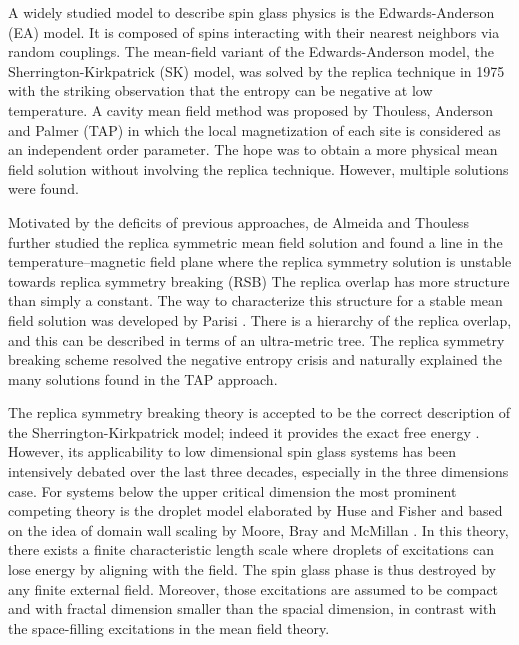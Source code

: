 A widely studied model to describe spin glass physics is the Edwards-Anderson 
(EA) model\cite{Edwards-Anderson1975}. It is composed of spins interacting
with their nearest neighbors via random couplings. The mean-field variant of the 
Edwards-Anderson model, the Sherrington-Kirkpatrick (SK) model\cite{Sherrington-Kirkpatrick1978,Sherrington-Kirkpatrick-1975},
was solved by the replica technique in 1975 with the striking observation that 
the entropy can be negative at low temperature\cite{Sherrington-Kirkpatrick-1975,Sherrington-Kirkpatrick1978}. 
A cavity mean field method was proposed by Thouless, Anderson 
and Palmer (TAP) in which the local magnetization of each site is considered as 
an independent order parameter\cite{Thouless-Anderson-Palmer-1977}. The hope was to 
obtain a more physical mean field solution without involving the replica technique. 
However, multiple solutions were found\cite{Bray-Moore-1980}.

Motivated by the deficits of previous approaches, de Almeida and Thouless
further studied the replica symmetric mean field solution and found a line 
in the temperature--magnetic field plane where the replica symmetry
solution is unstable towards replica symmetry breaking (RSB) \cite{Almedia-Thouless1978,Bray-Moore-1978}
The replica overlap has more structure than simply a constant. The way to 
characterize this structure for a stable mean field solution was developed 
by Parisi \cite{Parisi-1980a,Parisi-1980b,Parisi1980}.  There is a hierarchy 
of the replica overlap, and this can be described in terms of an ultra-metric tree. 
The replica symmetry breaking scheme resolved the negative entropy crisis and naturally 
explained the many solutions found in the TAP approach.

The replica symmetry breaking theory is accepted to be the correct description of the Sherrington-Kirkpatrick model; indeed 
it provides the exact free energy \cite{Talagrand-2006,Guerra-2003}. 
However, its applicability to low dimensional spin glass systems has been intensively debated 
over the last three decades, especially in the three dimensions case. For systems 
below the upper critical dimension \cite{Harris-Lubensky-Chen-1976,Tasaki-1989,Green-Moore-Bray-1983} 
the most prominent competing theory is the droplet model elaborated by 
Huse and Fisher \cite{Fisher-Huse-1988,Fisher-Huse-1987} and based on the idea of 
domain wall scaling by Moore, Bray and McMillan \cite{McMillan-1984,Bray-Moore-1987}. 
In this theory, there exists a finite characteristic length scale where droplets of 
excitations can lose energy by aligning with the field. The spin glass phase is thus 
destroyed by any finite external field. Moreover, those excitations are assumed to 
be compact and with fractal dimension smaller than the spacial dimension, in contrast 
with the space-filling excitations in the mean field theory. 

